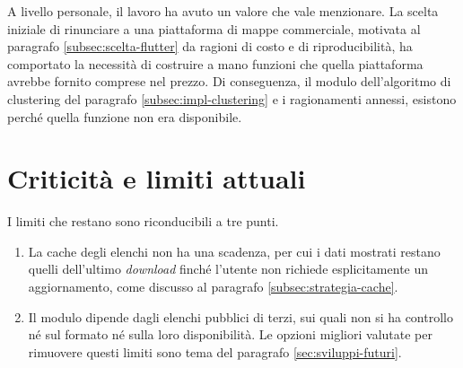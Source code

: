 A livello personale, il lavoro ha avuto un valore che vale menzionare.
La scelta iniziale di rinunciare a una piattaforma di mappe commerciale, motivata al paragrafo \ref{subsec:scelta-flutter} da
ragioni di costo e di riproducibilità, ha comportato la necessità di costruire a mano funzioni che quella piattaforma avrebbe fornito
comprese nel prezzo.
Di conseguenza, il modulo dell'algoritmo di clustering del paragrafo \ref{subsec:impl-clustering}
e i ragionamenti annessi, esistono perché quella funzione non era disponibile.

\section{Criticità e limiti attuali}\label{sec:limiti-attuali}

I limiti che restano sono riconducibili a tre punti.
\begin{enumerate}
    \item La cache degli elenchi non ha una scadenza, per cui i dati mostrati restano quelli dell'ultimo \textit{download} finché l'utente
    non richiede esplicitamente un aggiornamento, come discusso al paragrafo \ref{subsec:strategia-cache}.
    \item Il modulo dipende dagli elenchi pubblici di terzi, sui quali non si ha controllo né sul formato né sulla loro disponibilità.
    Le opzioni migliori valutate per rimuovere questi limiti sono tema del paragrafo \ref{sec:sviluppi-futuri}.
\end{enumerate}

